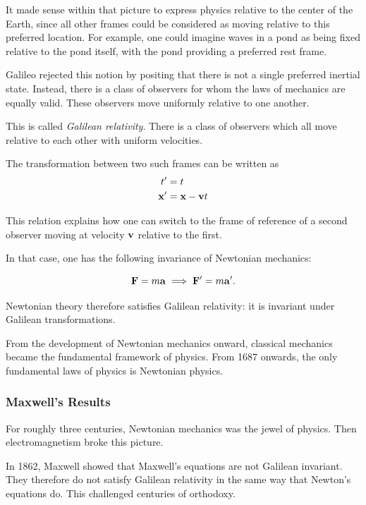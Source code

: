 		It made sense within that picture to express physics relative to the center of the Earth, since all other frames could be considered as moving relative to this preferred location. For example, one could imagine waves in a pond as being fixed relative to the pond itself, with the pond providing a preferred rest frame.


		Galileo rejected this notion by positing that there is not a single preferred inertial state. Instead, there is a class of observers for whom the laws of mechanics are equally valid. These observers move uniformly relative to one another.

		This is called \textit{Galilean relativity}. There is a class of observers which all move relative to each other with uniform velocities.

		The transformation between two such frames can be written as
		\begin{align}
			t' &= t\\
			\vb{x}' &= \vb{x} - \vb{v}t
		\end{align}

		This relation explains how one can switch to the frame of reference of a second observer moving at velocity $\vb{v}$ relative to the first.

		In that case, one has the following invariance of Newtonian mechanics:

		\begin{equation}
			\vb{F} = m\vb{a} \implies \vb{F}' = m\vb{a}'.
		\end{equation}

		Newtonian theory therefore satisfies Galilean relativity: it is invariant under Galilean transformations.

		From the development of Newtonian mechanics onward, classical mechanics became the fundamental framework of physics.
		From 1687 onwards, the only fundamental laws of physics is Newtonian physics.

	\subsubsection{Maxwell's Results}

		For roughly three centuries, Newtonian mechanics was the jewel of physics. Then electromagnetism broke this picture.

		In 1862, Maxwell showed that Maxwell's equations are not Galilean invariant. They therefore do not satisfy Galilean relativity in the same way that Newton's equations do. This challenged centuries of orthodoxy.

